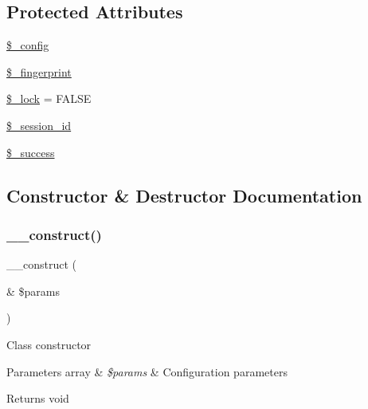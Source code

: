 \subsection*{Protected Attributes}
\begin{DoxyCompactItemize}
\item 
\mbox{\hyperlink{class_c_i___session__driver_a4d4ad4af1600438042f93a4492f8dbbe}{\$\+\_\+config}}
\item 
\mbox{\hyperlink{class_c_i___session__driver_ac926edb2847b6610e253be83270c2cc2}{\$\+\_\+fingerprint}}
\item 
\mbox{\hyperlink{class_c_i___session__driver_a1cfb8ce1d225fe600a6a034d685b8ff6}{\$\+\_\+lock}} = F\+A\+L\+SE
\item 
\mbox{\hyperlink{class_c_i___session__driver_a92023c94926d17b1f6705c8b1d35a103}{\$\+\_\+session\+\_\+id}}
\item 
\mbox{\hyperlink{class_c_i___session__driver_a0f7033d534d3f4ae0f5467368f724e7b}{\$\+\_\+success}}
\end{DoxyCompactItemize}


\subsection{Constructor \& Destructor Documentation}
\mbox{\label{class_c_i___session__driver_ac1669c73d53d6f16cf5459a1e84d39c8}} 
\subsubsection{\texorpdfstring{\+\_\+\+\_\+construct()}{\_\_construct()}}
{\footnotesize\ttfamily \+\_\+\+\_\+construct (\begin{DoxyParamCaption}\item[{\&}]{\$params }\end{DoxyParamCaption})}

Class constructor


\begin{DoxyParams}[1]{Parameters}
array & {\em \$params} & Configuration parameters \\
\hline
\end{DoxyParams}
\begin{DoxyReturn}{Returns}
void 
\end{DoxyReturn}


